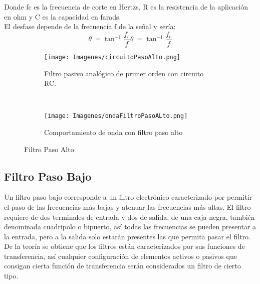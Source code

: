 \documentclass{article}
\begin{document}
Donde fc es la frecuencia de corte en Hertzs, R es la resistencia de la aplicación en ohm y C es la capacidad en farads.\citep{FiltroPasoAlto}\\

El desfase depende de la frecuencia f de la señal y sería:\citep{FiltroPasoAlto}\\

\begin{equation}
    {\displaystyle \theta \ =\tan ^{-1}{\frac {f_{c}}{f}}} {\displaystyle \theta \ =\tan ^{-1}{\frac {f_{c}}{f}}}
\end{equation}

\begin{figure}[h!]
    \centering
    \begin{subfigure}[b]{0.45\textwidth}
        \texttt{[image: Imagenes/circuitoPasoAlto.png]}
        \caption{Filtro pasivo analógico de primer orden con circuito RC.}
        \label{fig:circuitoPasoAlto}
    \end{subfigure}
    ~ %
    \begin{subfigure}[b]{0.45\textwidth}
        \texttt{[image: Imagenes/ondaFiltroPasoALto.png]}
        \caption{Comportamiento de onda con filtro paso alto}
        \label{fig:ondaPasoAlto}
    \end{subfigure}
   
    \caption{Filtro Paso Alto}\label{fig:filtroPasoAlto}
\end{figure}

\subsection{Filtro Paso Bajo}

Un filtro paso bajo corresponde a un filtro electrónico caracterizado por permitir el paso de las frecuencias más bajas y atenuar las frecuencias más altas. El filtro requiere de dos terminales de entrada y dos de salida, de una caja negra, también denominada cuadripolo o bipuerto, así todas las frecuencias se pueden presentar a la entrada, pero a la salida solo estarán presentes las que permita pasar el filtro. De la teoría se obtiene que los filtros están caracterizados por sus funciones de transferencia, así cualquier configuración de elementos activos o pasivos que consigan cierta función de transferencia serán considerados un filtro de cierto tipo.\citep{FiltroPasoBajo}\\
\end{document}
